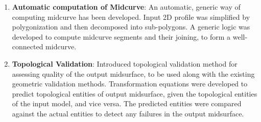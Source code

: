 \begin{enumerate}
\item {\bf Automatic computation of Midcurve}: An automatic, generic way of computing midcurve has been developed. Input 2D profile was simplified by polygonization and then decomposed into sub-polygons. A generic logic was developed to compute midcurve segments and their joining, to form a well-connected midcurve.
\item {\bf Topological Validation}: Introduced topological validation method for assessing quality of the output midsurface, to be used along with the existing geometric validation methods. Transformation equations were developed to predict topological entities of output midsurface, given the topological entities of the input model, and vice versa. The predicted entities were compared against the actual entities to detect any failures in the output midsurface.
\end{enumerate}



